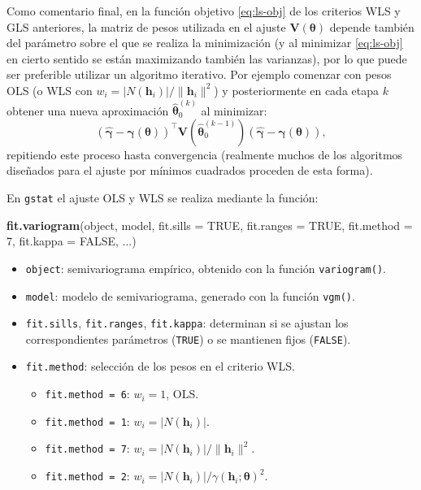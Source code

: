 \documentclass[
]{book}
\newenvironment{Shaded}{\begin{snugshade}}{\end{snugshade}}
\newcommand{\AttributeTok}[1]{\textcolor[rgb]{0.13,0.29,0.53}{#1}}
\newcommand{\ConstantTok}[1]{\textcolor[rgb]{0.56,0.35,0.01}{#1}}
\newcommand{\DecValTok}[1]{\textcolor[rgb]{0.00,0.00,0.81}{#1}}
\newcommand{\FunctionTok}[1]{\textcolor[rgb]{0.13,0.29,0.53}{\textbf{#1}}}
\newcommand{\NormalTok}[1]{#1}
\providecommand{\tightlist}{%
  \setlength{\itemsep}{0pt}\setlength{\parskip}{0pt}}
\theoremstyle{break}
\theoremstyle{definition}
\theoremstyle{definition}
\theoremstyle{definition}
\theoremstyle{definition}
\theoremstyle{remark}
\begin{document}
Como comentario final, en la función objetivo \eqref{eq:ls-obj} de los criterios WLS y GLS anteriores, la matriz de pesos utilizada en el ajuste \(\mathbf{V}(\boldsymbol{\theta})\) depende también del parámetro sobre el que se realiza la minimización (y al minimizar \eqref{eq:ls-obj} en cierto sentido se están maximizando también las varianzas), por lo que puede ser preferible utilizar un algoritmo iterativo.
Por ejemplo comenzar con pesos OLS (o WLS con \(w_{i} = \left| N(\mathbf{h}_{i})\right| / \| \mathbf{h}_{i} \|^2\)) y posteriormente en cada etapa \(k\) obtener una nueva aproximación \(\hat{\boldsymbol{\theta}}_0^{(k)}\) al minimizar:
\[\left( \hat{\boldsymbol{\gamma}} - \boldsymbol{\gamma}(\boldsymbol{\theta})\right)^{\top } \mathbf{V}(\hat{\boldsymbol{\theta}}_0^{(k-1)})\left( \hat{\boldsymbol{\gamma}} - \boldsymbol{\gamma}(\boldsymbol{\theta})\right),\]
repitiendo este proceso hasta convergencia (realmente muchos de los algoritmos diseñados para el ajuste por mínimos cuadrados proceden de esta forma).

En \texttt{gstat} el ajuste OLS y WLS se realiza mediante la función:

\begin{Shaded}
\begin{Highlighting}[]
\FunctionTok{fit.variogram}\NormalTok{(object, model, }\AttributeTok{fit.sills =} \ConstantTok{TRUE}\NormalTok{, }\AttributeTok{fit.ranges =} \ConstantTok{TRUE}\NormalTok{,}
              \AttributeTok{fit.method =} \DecValTok{7}\NormalTok{, }\AttributeTok{fit.kappa =} \ConstantTok{FALSE}\NormalTok{, ...)}
\end{Highlighting}
\end{Shaded}

\begin{itemize}
\item
  \texttt{object}: semivariograma empírico, obtenido con la función \texttt{variogram()}.
\item
  \texttt{model}: modelo de semivariograma, generado con la función \texttt{vgm()}.
\item
  \texttt{fit.sills}, \texttt{fit.ranges}, \texttt{fit.kappa}: determinan si se ajustan los correspondientes parámetros (\texttt{TRUE}) o se mantienen fijos (\texttt{FALSE}).
\item
  \texttt{fit.method}: selección de los pesos en el criterio WLS.

  \begin{itemize}
  \tightlist
  \item
    \texttt{fit.method\ =\ 6}: \(w_{i} = 1\), OLS.
  \item
    \texttt{fit.method\ =\ 1}: \(w_{i} = \left| N(\mathbf{h}_{i})\right|\).
  \item
    \texttt{fit.method\ =\ 7}: \(w_{i} = \left| N(\mathbf{h}_{i})\right| / \| \mathbf{h}_{i} \|^2\).
  \item
    \texttt{fit.method\ =\ 2}: \(w_{i} = \left| N(\mathbf{h}_{i})\right| /\gamma(\mathbf{h}_{i} ;\boldsymbol{\theta})^2\).
  \end{itemize}
\end{itemize}
\end{document}
